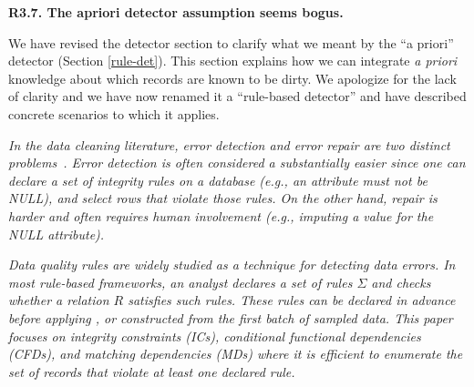 \vspace{0.5em}

\noindent\textbf{R3.7. The apriori detector assumption seems bogus.} 

\noindent  We have revised the detector section to clarify what we meant by the ``a priori'' detector (Section \ref{rule-det}). This section explains how we can integrate \emph{a priori} knowledge about which records are known to be dirty. We apologize for the lack of clarity and we have now renamed it a ``rule-based detector'' and have described concrete scenarios to which it applies. 

\vspace{0.5em}

\emph{In the data cleaning literature, error detection and error repair are two distinct problems~\cite{DBLP:series/synthesis/2012Fan, Dasu:2003:EDM:861869, rahm2000data}.
Error detection is often considered a substantially easier since one can declare a set of integrity rules on a database (e.g., an attribute must not be NULL), and select rows that violate those rules.
On the other hand, repair is harder and often requires human involvement (e.g., imputing a value for the NULL attribute).}

\vspace{0.5em}

\emph{Data quality rules are widely studied as a technique for detecting data errors.
In most rule-based frameworks, an analyst declares a set of rules $\Sigma$ and checks whether a relation $R$ satisfies such rules.
These rules can be declared in advance before applying \sys, or constructed from the first batch of sampled data.
This paper focuses on integrity constraints (ICs), conditional functional dependencies (CFDs), and matching dependencies (MDs) where it is efficient to enumerate the set of records that violate at least one declared rule. }